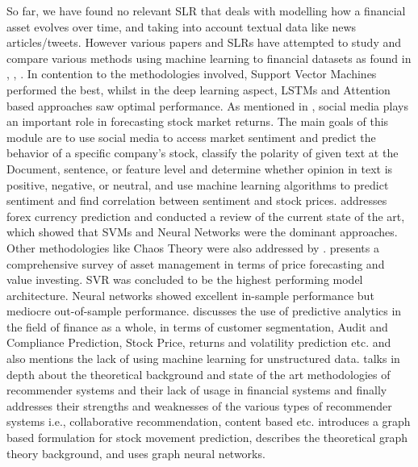 \documentclass[11pt]{article}
\begin{document}
So far, we have found no relevant SLR that deals with modelling how a financial asset evolves over time, and taking into account textual data like news articles/tweets. However various papers and SLRs have attempted to study and compare various methods using machine learning to financial datasets as found in \cite{Zhang2022}, \cite{Feng2018}, \cite{thakkar2021}. In contention to the methodologies involved, Support Vector Machines performed the best, whilst in the deep learning aspect, LSTMs and Attention based approaches saw optimal performance. As mentioned in \cite{Sharma2019}, social media plays an important role in forecasting stock market returns. The main goals of this module are to use social media to access market sentiment and predict the behavior of a specific company's stock, classify the polarity of given text at the Document, sentence, or feature level and determine whether opinion in text is positive, negative, or neutral, and use machine learning algorithms to predict sentiment and find correlation between sentiment and stock prices. \cite{islam2020} addresses forex currency prediction and conducted a review of the current state of the art, which showed that SVMs and Neural Networks were the dominant approaches. Other methodologies like Chaos Theory were also addressed by \cite{islam2020}. \cite{Ferrer2022} presents a comprehensive survey of asset management in terms of price forecasting and value investing. SVR was concluded to be the highest performing model architecture. Neural networks showed excellent in-sample performance but mediocre out-of-sample performance. \cite{broby2022} discusses the use of predictive analytics in the field of finance as a whole, in terms of customer segmentation, Audit and Compliance Prediction, Stock Price, returns and volatility prediction etc. and also mentions the lack of using machine learning for unstructured data. \cite{sharaf2022survey} talks in depth about the theoretical background and state of the art methodologies of recommender systems and their lack of usage in financial systems and finally addresses their strengths and weaknesses of the various types of recommender systems i.e., collaborative recommendation, content based etc. \cite{saha2022} introduces a graph based formulation for stock movement prediction, describes the theoretical graph theory background, and uses graph neural networks. 

\end{document}

